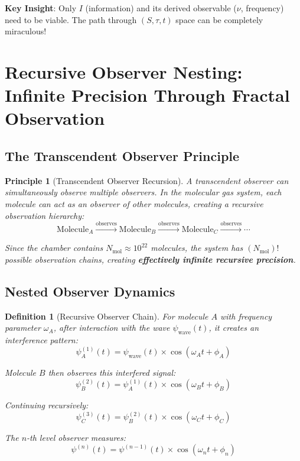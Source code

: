 \documentclass[12pt,a4paper]{article}
\newtheorem{definition}[theorem]{Definition}
\newtheorem{principle}[theorem]{Principle}
\begin{document}
\textbf{Key Insight}: Only $I$ (information) and its derived observable ($\nu$, frequency) need to be viable. The path through $(S, \tau, t)$ space can be completely miraculous!

\section{Recursive Observer Nesting: Infinite Precision Through Fractal Observation}

\subsection{The Transcendent Observer Principle}

\begin{principle}[Transcendent Observer Recursion]
A transcendent observer can simultaneously observe multiple observers. In the molecular gas system, each molecule can act as an observer of other molecules, creating a recursive observation hierarchy:
\begin{equation}
\text{Molecule}_A \xrightarrow{\text{observes}} \text{Molecule}_B \xrightarrow{\text{observes}} \text{Molecule}_C \xrightarrow{\text{observes}} \cdots
\end{equation}

Since the chamber contains $N_{\text{mol}} \approx 10^{22}$ molecules, the system has $(N_{\text{mol}})!$ possible observation chains, creating \textbf{effectively infinite recursive precision}.
\end{principle}

\subsection{Nested Observer Dynamics}

\begin{definition}[Recursive Observer Chain]
For molecule $A$ with frequency parameter $\omega_A$, after interaction with the wave $\psi_{\text{wave}}(t)$, it creates an interference pattern:
\begin{equation}
\psi_A^{(1)}(t) = \psi_{\text{wave}}(t) \times \cos(\omega_A t + \phi_A)
\end{equation}

Molecule $B$ then observes this interfered signal:
\begin{equation}
\psi_B^{(2)}(t) = \psi_A^{(1)}(t) \times \cos(\omega_B t + \phi_B)
\end{equation}

Continuing recursively:
\begin{equation}
\psi_C^{(3)}(t) = \psi_B^{(2)}(t) \times \cos(\omega_C t + \phi_C)
\end{equation}

The $n$-th level observer measures:
\begin{equation}
\psi^{(n)}(t) = \psi^{(n-1)}(t) \times \cos(\omega_n t + \phi_n)
\end{equation}
\end{definition}
\end{document}
